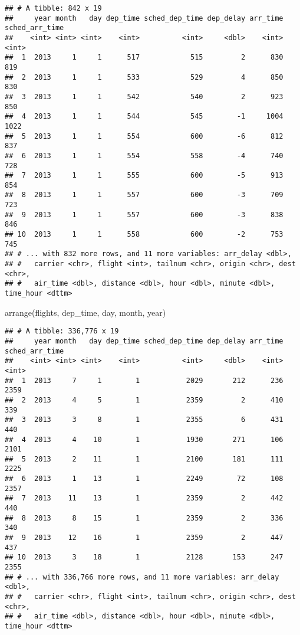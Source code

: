 \documentclass[
]{article}
\newenvironment{Shaded}{\begin{snugshade}}{\end{snugshade}}
\newcommand{\FunctionTok}[1]{\textcolor[rgb]{0.00,0.00,0.00}{#1}}
\newcommand{\NormalTok}[1]{#1}
\begin{document}
\begin{verbatim}
## # A tibble: 842 x 19
##     year month   day dep_time sched_dep_time dep_delay arr_time sched_arr_time
##    <int> <int> <int>    <int>          <int>     <dbl>    <int>          <int>
##  1  2013     1     1      517            515         2      830            819
##  2  2013     1     1      533            529         4      850            830
##  3  2013     1     1      542            540         2      923            850
##  4  2013     1     1      544            545        -1     1004           1022
##  5  2013     1     1      554            600        -6      812            837
##  6  2013     1     1      554            558        -4      740            728
##  7  2013     1     1      555            600        -5      913            854
##  8  2013     1     1      557            600        -3      709            723
##  9  2013     1     1      557            600        -3      838            846
## 10  2013     1     1      558            600        -2      753            745
## # ... with 832 more rows, and 11 more variables: arr_delay <dbl>,
## #   carrier <chr>, flight <int>, tailnum <chr>, origin <chr>, dest <chr>,
## #   air_time <dbl>, distance <dbl>, hour <dbl>, minute <dbl>, time_hour <dttm>
\end{verbatim}

\begin{Shaded}
\begin{Highlighting}[]
\FunctionTok{arrange}\NormalTok{(flights, dep\_time, day, month, year)}
\end{Highlighting}
\end{Shaded}

\begin{verbatim}
## # A tibble: 336,776 x 19
##     year month   day dep_time sched_dep_time dep_delay arr_time sched_arr_time
##    <int> <int> <int>    <int>          <int>     <dbl>    <int>          <int>
##  1  2013     7     1        1           2029       212      236           2359
##  2  2013     4     5        1           2359         2      410            339
##  3  2013     3     8        1           2355         6      431            440
##  4  2013     4    10        1           1930       271      106           2101
##  5  2013     2    11        1           2100       181      111           2225
##  6  2013     1    13        1           2249        72      108           2357
##  7  2013    11    13        1           2359         2      442            440
##  8  2013     8    15        1           2359         2      336            340
##  9  2013    12    16        1           2359         2      447            437
## 10  2013     3    18        1           2128       153      247           2355
## # ... with 336,766 more rows, and 11 more variables: arr_delay <dbl>,
## #   carrier <chr>, flight <int>, tailnum <chr>, origin <chr>, dest <chr>,
## #   air_time <dbl>, distance <dbl>, hour <dbl>, minute <dbl>, time_hour <dttm>
\end{verbatim}
\end{document}
